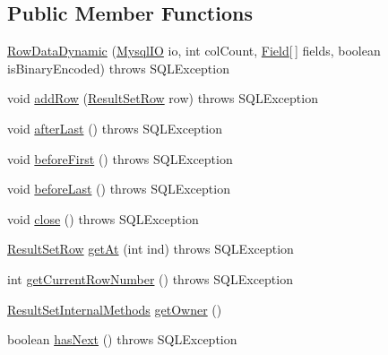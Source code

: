 \subsection*{Public Member Functions}
\begin{DoxyCompactItemize}
\item 
\mbox{\hyperlink{classcom_1_1mysql_1_1jdbc_1_1_row_data_dynamic_a5ca9be004d40e0affe57f22834eb91b6}{Row\+Data\+Dynamic}} (\mbox{\hyperlink{classcom_1_1mysql_1_1jdbc_1_1_mysql_i_o}{Mysql\+IO}} io, int col\+Count, \mbox{\hyperlink{classcom_1_1mysql_1_1jdbc_1_1_field}{Field}}\mbox{[}$\,$\mbox{]} fields, boolean is\+Binary\+Encoded)  throws S\+Q\+L\+Exception 
\item 
void \mbox{\hyperlink{classcom_1_1mysql_1_1jdbc_1_1_row_data_dynamic_a2ce60372d6361c19417d93cbea24a0c9}{add\+Row}} (\mbox{\hyperlink{classcom_1_1mysql_1_1jdbc_1_1_result_set_row}{Result\+Set\+Row}} row)  throws S\+Q\+L\+Exception 
\item 
void \mbox{\hyperlink{classcom_1_1mysql_1_1jdbc_1_1_row_data_dynamic_a6e2ff86fe3a346ae4f5a835470fd6986}{after\+Last}} ()  throws S\+Q\+L\+Exception 
\item 
void \mbox{\hyperlink{classcom_1_1mysql_1_1jdbc_1_1_row_data_dynamic_a16cbf687cace7fe4bf5701e9233c733f}{before\+First}} ()  throws S\+Q\+L\+Exception 
\item 
void \mbox{\hyperlink{classcom_1_1mysql_1_1jdbc_1_1_row_data_dynamic_a09397f78f848111ad10ddc5f75664d54}{before\+Last}} ()  throws S\+Q\+L\+Exception 
\item 
void \mbox{\hyperlink{classcom_1_1mysql_1_1jdbc_1_1_row_data_dynamic_a284d8e7db5b779d4c20de17f1f5b8c5c}{close}} ()  throws S\+Q\+L\+Exception 
\item 
\mbox{\hyperlink{classcom_1_1mysql_1_1jdbc_1_1_result_set_row}{Result\+Set\+Row}} \mbox{\hyperlink{classcom_1_1mysql_1_1jdbc_1_1_row_data_dynamic_a8d011f77f4119fb0bb18623bc874ae3e}{get\+At}} (int ind)  throws S\+Q\+L\+Exception 
\item 
int \mbox{\hyperlink{classcom_1_1mysql_1_1jdbc_1_1_row_data_dynamic_a41a9e435a520104e0e4ff6d89717702d}{get\+Current\+Row\+Number}} ()  throws S\+Q\+L\+Exception 
\item 
\mbox{\hyperlink{interfacecom_1_1mysql_1_1jdbc_1_1_result_set_internal_methods}{Result\+Set\+Internal\+Methods}} \mbox{\hyperlink{classcom_1_1mysql_1_1jdbc_1_1_row_data_dynamic_af879dc010e19afaf62c037d9cfca5c8f}{get\+Owner}} ()
\item 
boolean \mbox{\hyperlink{classcom_1_1mysql_1_1jdbc_1_1_row_data_dynamic_a4a34ec97dbfebd279d8008c69316b5be}{has\+Next}} ()  throws S\+Q\+L\+Exception 

\end{DoxyCompactItemize}
